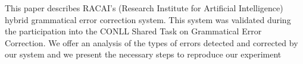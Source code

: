 This paper describes RACAI's (Research Institute for Artificial Intelligence) hybrid grammatical error correction system. This system was validated during the participation into the CONLL Shared Task on Grammatical Error Correction. We offer an analysis of the types of errors detected and corrected by our system and we present the necessary steps to reproduce our experiment
